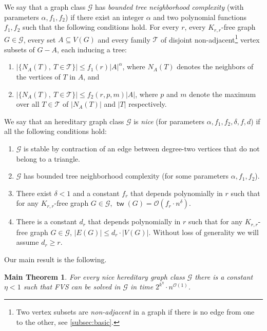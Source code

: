 \documentclass{amsart}
\newtheorem*{main-thm}{Main Theorem}
\newcommand{\mT}{\mathcal{T}}
\renewcommand{\d}{d}
\newcommand{\f}{f}
\DeclareMathOperator\tw{\textsf{tw}}
\renewcommand{\O}{\mathcal{O}}
\begin{document}
\begin{definition}\label{def:NCtrees}
We say that a graph class $\mathcal{G}$ has \emph{bounded tree neighborhood complexity} (with parameters  $\alpha,f_1,f_2$) if there exist an integer $\alpha$ and two polynomial functions $f_1,f_2$ such that the following conditions hold.
For every $r$, every $K_{r,r}$-free graph $G \in \mathcal{G}$, every set $A\subseteq V(G)$ and every family $\mT$ of disjoint non-adjacent\footnote{Two vertex subsets are \emph{non-adjacent} in a graph if there is no edge from one to the other, see \autoref{subsec:basic}.} vertex subsets of $G-A$, each inducing a tree:
\begin{enumerate}
    \item $|\{N_A(T),~T\in \mT \}|\leq f_1(r) |A|^{\alpha}$, where $N_A(T)$ denotes the neighbors of the vertices of $T$ in $A$, and\label{def:NCtrees:item1}
    \item $|\{N_A(T),~T\in \mT\}|\leq f_2(r,p,m)|A|$, where $p$ and $m$ denote the maximum  over all $T\in \mT$ of $|N_A(T)|$ and $|T|$ respectively. \label{def:NCtrees:item2}
\end{enumerate}
\end{definition}


\begin{definition}\label{def:prop}
We say that an hereditary graph class $\mathcal{G}$ is \emph{nice} (for parameters $\alpha,\f_1,\f_2, \delta, \f, \d$) if all the following conditions hold: 
\begin{enumerate}
    \item $\mathcal{G}$ is stable by contraction of an edge between degree-two vertices that do not belong to a triangle.\label{def:prop:deg2}
    \item $\mathcal{G}$ has bounded tree neighborhood complexity (for some parameters $\alpha,f_1,f_2$).\label{def:prop:nc}
    \item There exist $\delta < 1$ and a constant $\f_r$ that depends polynomially in $r$ such that for any $K_{r,r}$-free graph $G \in \mathcal{G}$, $\tw(G)=\O(\f_r\cdot n^{\delta})$.\label{def:prop:tw}
    \item There is a constant $\d_r$ that depends polynomially  in $r$ such that for any $K_{r,r}$-free graph $G \in \mathcal{G}$, $|E(G)|\leq \d_r\cdot |V(G)|$. Without loss of generality we will assume $d_r\geq r$.\label{def:prop:sparse}
\end{enumerate}
\end{definition}

Our main result is the following. 
\begin{main-thm}\label{main-thm}
For every nice hereditary graph class $\mathcal{G}$ there is a constant $\eta<1$ such that FVS can be solved in $\mathcal{G}$ in time $2^{k^\eta}\cdot  n^{\O(1)}$.

\end{main-thm}
\end{document}
